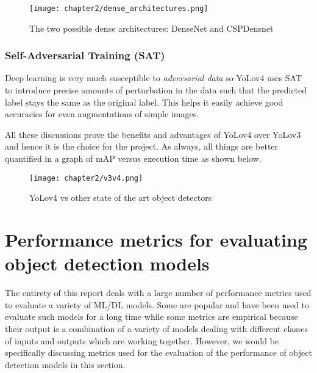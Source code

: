 \begin{figure}[h]
  \centering
    \texttt{[image: chapter2/dense\_architectures.png]}
  \caption{The two possible dense architectures: DenseNet and CSPDensnet}
  \label{fig:dense_arch}
\end{figure}

\subsubsection{Self-Adversarial Training (SAT)}
Deep learning is very much susceptible to \textit{adversarial data} so YoLov4 uses SAT to introduce precise amounts of perturbation in the data such that the predicted label stays the same as the original label. This helps it easily achieve good accuracies for even augmentations of simple images.

All these discussions prove the benefits and advantages of YoLov4 over YoLov3 and hence it is the choice for the project. As always, all things are better quantified in a graph of mAP versus execution time as shown below.

\begin{figure}[h]
  \centering
  \texttt{[image: chapter2/v3v4.png]}
  \caption{YoLov4 vs other state of the art object detectors}
  \label{fig:v3_vs_v4}
\end{figure}


\section{Performance metrics for evaluating object detection models \cite{Koech2020}}  \label{metrics}

The entirety of this report deals with a large number of performance metrics used to evaluate a variety of ML/DL models. Some are popular and have been used to evaluate such models for a long time while some metrics are empirical because their output is a combination of a variety of models dealing with different classes of inputs and outputs which are working together. However, we would be specifically discussing metrics used for the evaluation of the performance of object detection models in this section.
